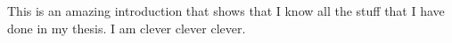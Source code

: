 \documentclass[../../CompleteThesis/Complete_1stDraft]{subfiles}
\begin{document}
This is an amazing introduction that shows that I know all the stuff that I have done in my thesis. I am clever clever clever.
\end{document}
